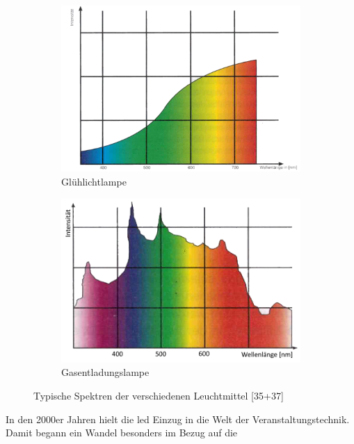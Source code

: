 \documentclass[11pt]{scrartcl}
\begin{document}
\begin{figure}[H]
    \centering
    \begin{subfigure}[b]{0.49\textwidth}
        \includegraphics[width=\textwidth]{images/conventional_spectrum.png}
        \caption{Glühlichtlampe}
    \end{subfigure}
    \hfill 
    \begin{subfigure}[b]{0.49\textwidth}
        \includegraphics[width=\textwidth]{images/HMI_Spectrum.png}
        \caption{Gasentladungslampe}
    \end{subfigure}
    \caption[Typische Spektren der verschiedenen Leuchtmittel]{Typische Spektren der verschiedenen Leuchtmittel \cite{showlicht}[35+37]}\label{fig:lightEmiiterSpects}
\end{figure}
\noindent
In den 2000er Jahren hielt die \ac{led} Einzug in die Welt der Veranstaltungstechnik. Damit begann ein Wandel besonders im Bezug auf die
\end{document}
